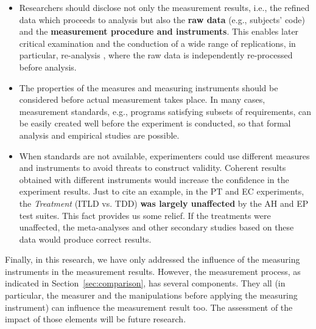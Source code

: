 \begin{itemize}

\item Researchers should disclose not only the measurement results, i.e., the refined data which proceeds to analysis but also the \textbf{raw data} (e.g., subjects' code) and the \textbf{measurement procedure and instruments}. This enables later critical examination and the conduction of a wide range of replications, in particular, re-analysis \cite{mittelstaedt1984econometric,IJzendoorn1994}, where the raw data is independently re-processed before analysis. 

\item The properties of the measures and measuring instruments should be considered before actual measurement takes place. In many cases, measurement standards, e.g., programs satisfying subsets of requirements, can be easily created well before the experiment is conducted, so that formal analysis and empirical studies are possible.

\item When standards are not available, experimenters could use different measures and instruments to avoid threats to construct validity. Coherent results obtained with different instruments would increase the confidence in the experiment results. Just to cite an example, in the PT and EC experiments, the \textit{Treatment} (ITLD vs. TDD) \textbf{was largely unaffected} by the AH and EP test suites. This fact provides us some relief. If the treatments were unaffected, the meta-analyses and other secondary studies based on these data would produce correct results.

\end{itemize}

Finally, in this research, we have only addressed the influence of the measuring instruments in the measurement results. However, the measurement process, as indicated in Section~\ref{sec:comparison}, has several components. They all (in particular, the measurer and the manipulations before applying the measuring instrument) can influence the measurement result too. The assessment of the impact of those elements will be future research.